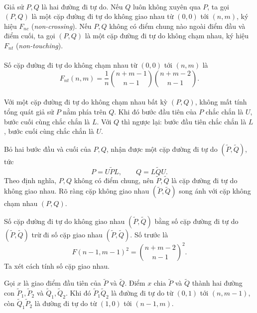 \documentclass[11pt]{article}
\begin{document}
\paragraph{}
Giả sử \(P,Q\) là hai đường đi tự do. Nếu \(Q\) luôn không xuyên qua \(P\), ta
gọi \((P,Q)\) là một cặp đường đi tự do không giao nhau từ \((0,0)\) tới
\((n,m)\), ký hiệu \(F_{nc}\) (\emph{non-crossing}). Nếu \(P,Q\) không có
điểm chung nào ngoài điểm đầu và điểm cuối, ta gọi \((P,Q)\) là một cặp đường
đi tự do không chạm nhau, ký hiệu \(F_{nt}\) (\emph{non-touching}).

\paragraph{}
Số cặp đường đi tự do không chạm nhau từ \((0,0)\) tới \((n,m)\) là
\[
  F_{nt}(n,m)
  =\frac1n
    \binom{n+m-1}{n-1}
    \binom{n+m-2}{n-1}. \tag{15}
\]

\paragraph{}
Với một cặp đường đi tự do không chạm nhau bất kỳ \((P,Q)\), không mất tính
tổng quát giả sử \(P\) nằm phía trên \(Q\). Khi đó bước đầu tiên của \(P\)
chắc chắn là \(U\), bước cuối cùng chắc chắn là \(L\). Với \(Q\) thì ngược
lại: bước đầu tiên chắc chắn là \(L\), bước cuối cùng chắc chắn là \(U\).

Bỏ hai bước đầu và cuối của \(P,Q\), nhận được một cặp đường đi tự do
\((\widetilde P,\widetilde Q)\), tức
\[
  P=U\widetilde P L,\qquad Q=L\widetilde Q U.
\]
Theo định nghĩa, \(P,Q\) không có điểm chung, nên
\(\widetilde P,\widetilde Q\) là cặp đường đi tự do không giao nhau. Rõ ràng
cặp không giao nhau \((\widetilde P,\widetilde Q)\) song ánh với cặp không
chạm nhau \((P,Q)\).

Số cặp đường đi tự do không giao nhau \((\widetilde P,\widetilde Q)\) bằng số
cặp đường đi tự do \((\widetilde P,\widetilde Q)\) trừ đi số cặp giao nhau
\((\widetilde P,\widetilde Q)\). Số trước là
\[
  F(n-1,m-1)^2=\binom{n+m-2}{n-1}^2.
\]
Ta xét cách tính số cặp giao nhau.

Gọi \(x\) là giao điểm đầu tiên của \(\widetilde P\) và \(\widetilde Q\).
Điểm \(x\) chia \(\widetilde P\) và \(\widetilde Q\) thành hai đường con
\(\widetilde P_1,\widetilde P_2\) và
\(\widetilde Q_1,\widetilde Q_2\). Khi đó
\(\widetilde P_1\widetilde Q_2\) là đường đi tự do từ \((0,1)\) tới
\((n,m-1)\), còn \(\widetilde Q_1\widetilde P_2\) là đường đi tự do từ
\((1,0)\) tới \((n-1,m)\).
\end{document}
